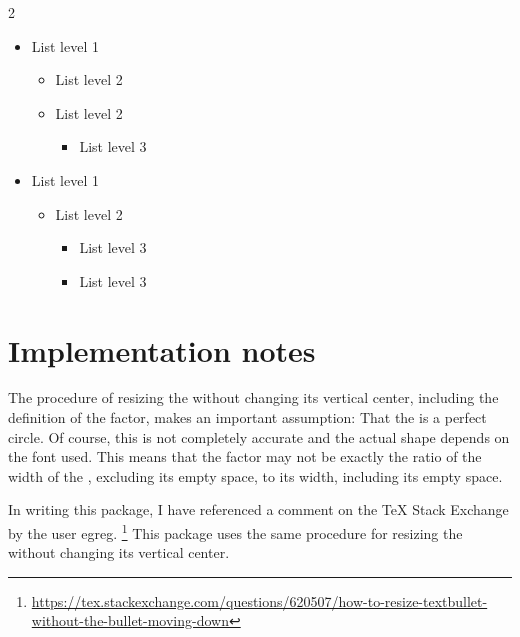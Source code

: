 \documentclass{beerydoc}
\begin{document}
\begingroup
  \newfontfamilysourceseriffour
  \begin{multicols}{2}
    \begin{itemize}
      \item List level 1
      \begin{itemize}
        \item List level 2
        \item List level 2
        \begin{itemize}
          \item List level 3
        \end{itemize}
      \end{itemize}
      \item List level 1
      \begin{itemize}
        \item List level 2
        \begin{itemize}
          \item List level 3
          \item List level 3
        \end{itemize}
      \end{itemize}
    \end{itemize}
  \end{multicols}
\endgroup


\section{Implementation notes}
\label{sec:implementation}

The procedure of resizing the  without changing its vertical
center, including the definition of the  factor, makes an
important assumption:
That the  is a perfect circle.
Of course, this is not completely accurate and the actual shape depends on the
font used.
This means that the  factor may not be exactly the ratio of the
width of the , excluding its empty space, to its width,
including its empty space.

In writing this package, I have referenced a comment on the \TeX{} Stack
Exchange by the user egreg.%
\footnote{\url{https://tex.stackexchange.com/questions/620507/how-to-resize-textbullet-without-the-bullet-moving-down}}
This package uses the same procedure for resizing the  without
changing its vertical center.
\end{document}
